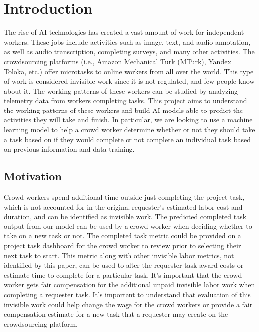 \documentclass[11pt]{article}
\begin{document}

\section{Introduction}

\begin{multicols}{2}

The rise of AI technologies has created a vast amount of work for independent workers. These jobs include activities such as image, text, and audio annotation, as well as audio transcription, completing surveys, and many other activities. The crowdsourcing platforms (i.e., Amazon Mechanical Turk (MTurk), Yandex Toloka, etc.) offer microtasks to online workers from all over the world. This type of work is considered invisible work since it is not regulated, and few people know about it. The working patterns of these workers can be studied by analyzing telemetry data from workers completing tasks. This project aims to understand the working patterns of these workers and build AI models able to predict the activities they will take and finish. In particular, we are looking to use a machine learning model to help a crowd worker determine whether or not they should take a task based on if they would complete or not complete an individual task based on previous information and data training.

\subsection{Motivation}
Crowd workers spend additional time outside just completing the project task, which is not accounted for in the original requester’s estimated labor cost and duration, and can be identified as invisible work. The predicted completed task output from our model can be used by a crowd worker when deciding whether to take on a new task or not. The completed task metric could be provided on a project task dashboard for the crowd worker to review prior to selecting their next task to start. This metric along with other invisible labor metrics, not identified by this paper, can be used to alter the requester task award costs or estimate time to complete for a particular task. It’s important that the crowd worker gets fair compensation for the additional unpaid invisible labor work when completing a requester task. It’s important to understand that evaluation of this invisible work could help change the wage for the crowd workers or provide a fair compensation estimate for a new task that a requester may create on the crowdsourcing platform.  


\end{multicols}
\end{document}
